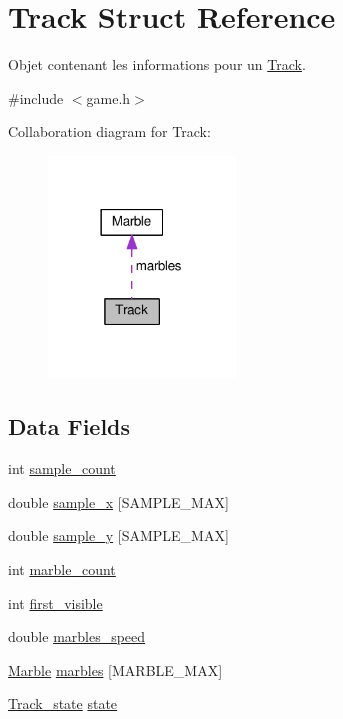 \hypertarget{struct_track}{}\section{Track Struct Reference}
\label{struct_track}


Objet contenant les informations pour un \hyperlink{struct_track}{Track}.  




{\ttfamily \#include $<$game.\+h$>$}



Collaboration diagram for Track\+:
\nopagebreak
\begin{figure}[H]
\begin{center}
\leavevmode
\includegraphics[width=141pt]{struct_track__coll__graph}
\end{center}
\end{figure}
\subsection*{Data Fields}
\begin{DoxyCompactItemize}
\item 
int \hyperlink{struct_track_a9e0d21871ffe556f58524ae0eab311b4}{sample\+\_\+count}
\item 
double \hyperlink{struct_track_aa3ed1a4220174d38001d02282fbee22b}{sample\+\_\+x} \mbox{[}S\+A\+M\+P\+L\+E\+\_\+\+M\+AX\mbox{]}
\item 
double \hyperlink{struct_track_a44edcc22cd2d982e8d90baa5aed0d36f}{sample\+\_\+y} \mbox{[}S\+A\+M\+P\+L\+E\+\_\+\+M\+AX\mbox{]}
\item 
int \hyperlink{struct_track_a59a42793ead243ec50ad584730b1fdab}{marble\+\_\+count}
\item 
int \hyperlink{struct_track_a5186ecb1e6c5695791274cd52cac839c}{first\+\_\+visible}
\item 
double \hyperlink{struct_track_a4acb65a6d65a7958036ed901abe0a6bb}{marbles\+\_\+speed}
\item 
\hyperlink{struct_marble}{Marble} \hyperlink{struct_track_a90e02a52ca50397997058e7b8dbab421}{marbles} \mbox{[}M\+A\+R\+B\+L\+E\+\_\+\+M\+AX\mbox{]}
\item 
\hyperlink{game_8h_a3d584d1e4b7b4c4a3cde3944c28fe594}{Track\+\_\+state} \hyperlink{struct_track_aadbac9f12492034fea9600a5ce4c7c5f}{state}
\end{DoxyCompactItemize}


